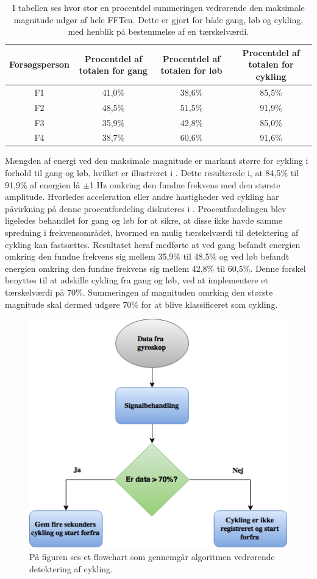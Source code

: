 \begin{table}[H]
	\centering
		\begin{tabular}{cccc}
			\hline
			\rowcolor[HTML]{C0C0C0} 
			Forsøgsperson & Procentdel af totalen for gang & Procentdel af totalen for løb & Procentdel af totalen for cykling \\ \hline
			F1 & 41,0\% & 38,6\% & 85,5\% \\ \hline	
			F2 & 48,5\% & 51,5\% & 91,9\% \\ \hline	
			F3 & 35,9\% & 42,8\% & 85,0\% \\ \hline
			F4 & 38,7\% & 60,6\% & 91,6\% \\ \hline
		\end{tabular}
	\caption{I tabellen ses hvor stor en procentdel summeringen vedrørende den maksimale magnitude udgør af hele FFTen. Dette er gjort for både gang, løb og cykling, med henblik på bestemmelse af en tærskelværdi.}
	\label{tab:individuel_procent}
\end{table}\vspace{-0.5cm}
Mængden af energi ved den maksimale magnitude er markant større for cykling i forhold til gang og løb, hvilket er illustreret i . Dette resulterede i, at 84,5\% til 91,9\% af energien lå $\pm$1 Hz omkring den fundne frekvens med den største amplitude. Hvorledes acceleration eller andre hastigheder ved cykling har påvirkning på denne procentfordeling diskuteres i . Procentfordelingen blev ligeledes behandlet for gang og løb for at sikre, at disse ikke havde samme spredning i frekvensområdet, hvormed en mulig tærskelværdi til detektering af cykling kan fastsættes. Resultatet heraf medførte at ved gang befandt energien omkring den fundne frekvens sig mellem 35,9\% til 48,5\% og ved løb befandt energien omkring den fundne frekvens sig mellem 42,8\% til 60,5\%. Denne forskel benyttes til at adskille cykling fra gang og løb, ved at implementere et tærskelværdi på 70\%. Summeringen af magnituden omrking den største magnitude skal dermed udgøre 70\% for at blive klassificeret som cykling. 
\begin{figure}[H]
	\centering
	\includegraphics[scale=0.6]{figures/cDesign/algoritme_cykling.png}
	\caption{På figuren ses et flowchart som gennemgår algoritmen vedrørende detektering af cykling.}
	\label{fig:algoritme_cykling}
\end{figure}
